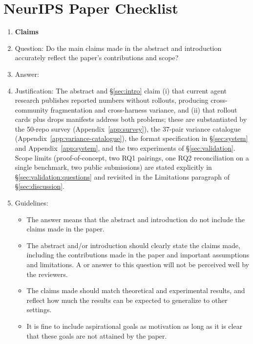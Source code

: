 \section*{NeurIPS Paper Checklist}

\begin{enumerate}

\item {\bf Claims}
    \item[] Question: Do the main claims made in the abstract and introduction accurately reflect the paper's contributions and scope?
    \item[] Answer: \answerYes{}
    \item[] Justification: The abstract and \S\ref{sec:intro} claim (i) that current agent research publishes reported numbers without rollouts, producing cross-community fragmentation and cross-harness variance, and (ii) that rollout cards plus drops manifests address both problems; these are substantiated by the 50-repo survey (Appendix~\ref{app:survey}), the 37-pair variance catalogue (Appendix~\ref{app:variance-catalogue}), the format specification in \S\ref{sec:system} and Appendix~\ref{app:system}, and the two experiments of \S\ref{sec:validation}. Scope limits (proof-of-concept, two RQ1 pairings, one RQ2 reconciliation on a single benchmark, two public submissions) are stated explicitly in \S\ref{sec:validation:questions} and revisited in the Limitations paragraph of \S\ref{sec:discussion}.
    \item[] Guidelines:
    \begin{itemize}
        \item The answer \answerNA{} means that the abstract and introduction do not include the claims made in the paper.
        \item The abstract and/or introduction should clearly state the claims made, including the contributions made in the paper and important assumptions and limitations. A \answerNo{} or \answerNA{} answer to this question will not be perceived well by the reviewers.
        \item The claims made should match theoretical and experimental results, and reflect how much the results can be expected to generalize to other settings.
        \item It is fine to include aspirational goals as motivation as long as it is clear that these goals are not attained by the paper.
    \end{itemize}


\end{enumerate}
